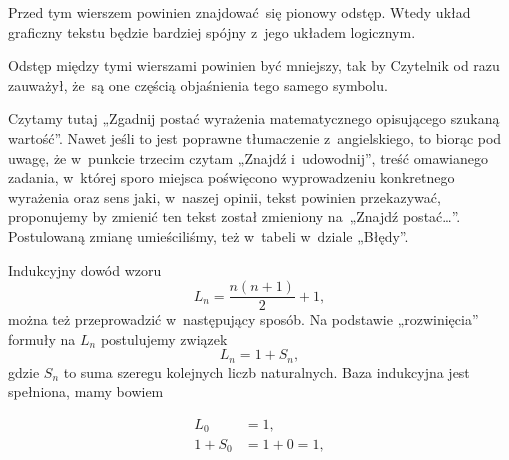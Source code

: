 \documentclass[a4paper,11pt]{article}
\numberwithin{equation}{section}
\begin{document}
\vspace{0em}


\noindent
{} Przed tym wierszem powinien znajdować~się pionowy
odstęp. Wtedy układ graficzny tekstu będzie bardziej spójny z~jego układem
logicznym.

\VerSpaceFour





\noindent
{} Odstęp między tymi wierszami powinien być
mniejszy, tak by Czytelnik od razu zauważył, że~są one częścią objaśnienia
tego samego symbolu.

\VerSpaceFour





\noindent
{} Czytamy tutaj „Zgadnij postać wyrażenia matematycznego
opisującego szukaną wartość”. Nawet jeśli to jest poprawne tłumaczenie
z~angielskiego, to biorąc pod uwagę, że w~punkcie trzecim czytam „Znajdź
i~udowodnij”, treść omawianego zadania, w~której sporo miejsca poświęcono
wyprowadzeniu konkretnego wyrażenia oraz sens jaki, w~naszej opinii, tekst
powinien przekazywać, proponujemy by zmienić ten tekst został zmieniony
na~„Znajdź postać\ldots”. Postulowaną zmianę umieściliśmy, też w~tabeli w~dziale
„Błędy”.

\VerSpaceFour





\noindent
{} Indukcyjny dowód wzoru
\begin{equation}
  \label{eq:1111}
  L_{ n } = \frac{ n ( n + 1 ) }{ 2 } + 1,
\end{equation}
można też przeprowadzić w~następujący sposób. Na podstawie „rozwinięcia”
formuły na $L_{ n }$ postulujemy związek
\begin{equation}
  \label{eq:1113}
  L_{ n } = 1 + S_{ n },
\end{equation}
gdzie $S_{ n }$ to suma szeregu kolejnych liczb naturalnych. Baza indukcyjna
jest spełniona, mamy bowiem

\negVerSpaceFive


\begin{subequations}

  \begin{align}
    \label{eq:1114}
    L_{ 0 } &= 1, \\
    1 + S_{ 0 } &= 1 + 0 = 1,
  \end{align}

\end{subequations}
\end{document}
